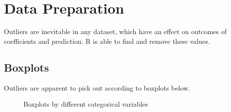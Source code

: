 \documentclass[a4paper,11pt,onecolumn,twoside]{article}
\begin{document}
\section{Data Preparation}
Outliers are inevitable in any dataset, which have an effect on outcomes of coefficients and prediction. R is able to find and remove these values.
\subsection{Boxplots}
Outliers are apparent to pick out according to boxplots below.
\begin{figure}[H]
	\centering
	\caption{Boxplots by different categorical variables}
\end{figure}
\end{document}
